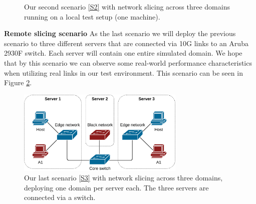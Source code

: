 \begin{description}[style=multiline, labelwidth=0.7cm]
\begin{figure}[ht]
        \caption[Validation Scenario 2]{Our second scenario \ref{S2} with network slicing across three domains running on a local test setup (one machine).}
        \label{fig:scenario_2}
    \end{figure}
    \item[\namedlabel{S3}{S3}] \textbf{Remote slicing scenario} As the last scenario we will deploy the previous scenario to three different servers that are connected via 10G links to an Aruba 2930F switch. Each server will contain one entire simulated domain. We hope that by this scenario we can observe some real-world performance characteristics when utilizing real links in our test environment. This scenario can be seen in Figure \ref{fig:scenario_3}.
    \begin{figure}[ht]
        \centering
        \includegraphics[width=8cm]{images/chapter_7/scenario_3.png}
        \caption[Validation Scenario 3]{Our last scenario \ref{S3} with network slicing across three domains, deploying one domain per server each. The three servers are connected via a switch.}
        \label{fig:scenario_3}
    \end{figure}
\end{description}



